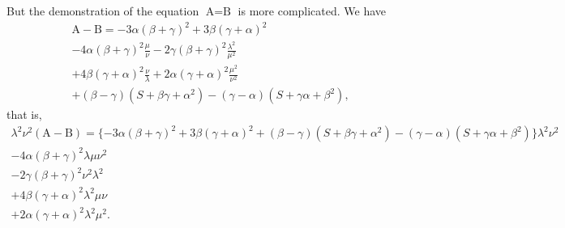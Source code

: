 \documentclass[12pt,a4paper]{article}
\theoremstyle{plain}
\begin{document}
But the demonstration of the equation $\text{A} = \text{B}$ is more complicated. We have
%
\begin{multline}
\text{A} - \text{B} = -3\alpha(\beta + \gamma)^{2} + 3\beta(\gamma + \alpha)^{2} \\
- 4\alpha(\beta + \gamma)^{2}\tfrac{\mu}{\nu} - 2\gamma(\beta + \gamma)^{2}\tfrac{\lambda^{2}}{\mu^{2}} \\
+ 4\beta(\gamma + \alpha)^{2}\tfrac{\nu}{\lambda} + 2\alpha(\gamma + \alpha)^{2}\tfrac{\mu^{2}}{\nu^{2}} \\
+ (\beta - \gamma)(S + \beta\gamma + \alpha^{2}) - (\gamma - \alpha)(S + \gamma\alpha + \beta^{2}),
\end{multline}
%
that is,
%
\begin{multline}
\lambda^{2}\nu^{2}(\text{A} - \text{B}) = \{-3\alpha(\beta + \gamma)^{2} + 3\beta(\gamma + \alpha)^{2} + (\beta - \gamma)(S + \beta\gamma + \alpha^{2}) - (\gamma - \alpha)(S + \gamma\alpha + \beta^{2})\}\lambda^{2}\nu^{2} \\
- 4\alpha(\beta + \gamma)^{2}\lambda\mu\nu^{2} \\
- 2\gamma(\beta + \gamma)^{2}\nu^{2}\lambda^{2} \\
+ 4\beta(\gamma + \alpha)^{2}\lambda^{2}\mu\nu \\
+ 2\alpha(\gamma + \alpha)^{2}\lambda^{2}\mu^{2}.
\end{multline}

\newpage
\setcounter{page}{111}
\end{document}
